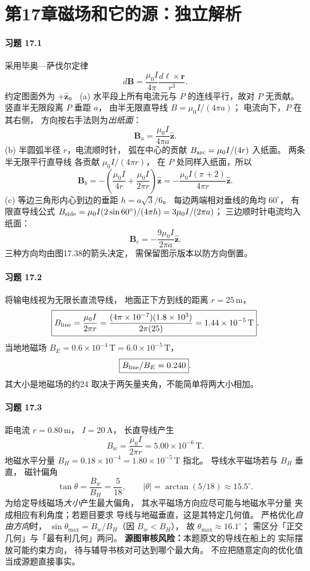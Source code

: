 \section*{第17章\quad 磁场和它的源：独立解析}

\paragraph{习题 17.1}
采用毕奥—萨伐尔定律
\[
 d\boldsymbol B=\frac{\mu_0 I}{4\pi}
 \frac{d\boldsymbol\ell\times\boldsymbol r}{r^3}.
\]
约定图面外为 \(+\hat{\boldsymbol z}\)。
(a) 水平段上所有电流元与
\(P\) 的连线平行，故对 \(P\) 无贡献。
竖直半无限段离 \(P\) 垂距 \(a\)，
由半无限直导线
\(B=\mu_0I/(4\pi a)\)；
电流向下，\(P\) 在其右侧，
方向按右手法则为\emph{出纸面}：
\[
 \boxed{\boldsymbol B_a=
 \frac{\mu_0I}{4\pi a}\hat{\boldsymbol z}}.
\]
(b) 半圆弧半径 \(r\)，电流顺时针，
弧在中心的贡献
\(B_{\rm arc}=\mu_0I/(4r)\) 入纸面。
两条半无限平行直导线
各贡献 \(\mu_0I/(4\pi r)\)，
在 \(P\) 处同样入纸面，所以
\[
 \boxed{\boldsymbol B_b=
 -\left(\frac{\mu_0I}{4r}
 +\frac{\mu_0I}{2\pi r}\right)
 \hat{\boldsymbol z}
 =-\frac{\mu_0I(\pi+2)}{4\pi r}
 \hat{\boldsymbol z}}.
\]
(c) 等边三角形内心到边的垂距
\(h=a\sqrt3/6\)。
每边两端相对垂线的角均 \(60^\circ\)，
有限直导线公式
\(B_{\rm side}=\mu_0I(2\sin60^\circ)/(4\pi h)
 =3\mu_0I/(2\pi a)\)；
三边顺时针电流均入纸面：
\[
 \boxed{\boldsymbol B_c=
 -\frac{9\mu_0I}{2\pi a}\hat{\boldsymbol z}}.
\]
三种方向均由图17.38的箭头决定，
需保留图示版本以防方向倒置。

\paragraph{习题 17.2}
将输电线视为无限长直流导线，
地面正下方到线的距离 \(r=25\,\mathrm m\)，
\[
 \boxed{B_{\rm line}=\frac{\mu_0I}{2\pi r}
 =\frac{(4\pi\times10^{-7})(1.8\times10^3)}
 {2\pi(25)}
 =1.44\times10^{-5}\,\mathrm T}.
\]
当地地磁场
\(B_E=0.6\times10^{-4}\,\mathrm T
 =6.0\times10^{-5}\,\mathrm T\)，
\[
 \boxed{B_{\rm line}/B_E=0.240}.
\]
其大小是地磁场的约24%
取决于两矢量夹角，不能简单将两大小相加。

\paragraph{习题 17.3}
距电流 \(r=0.80\,\mathrm m\)，
\(I=20\,\mathrm A\)，
长直导线产生
\[
 \boxed{B_w=\frac{\mu_0I}{2\pi r}
 =5.00\times10^{-6}\,\mathrm T}.
\]
地磁水平分量
\(B_H=0.18\times10^{-4}
 =1.80\times10^{-5}\,\mathrm T\) 指北。
导线水平磁场若与 \(B_H\) 垂直，
磁针偏角
\[
 \boxed{\tan\theta=\frac{B_w}{B_H}
 =\frac5{18}},\qquad
 \boxed{|\theta|=\arctan(5/18)\approx15.5^\circ}.
\]
为给定导线磁场\emph{大小}产生最大偏角，
其水平磁场方向应尽可能与地磁水平分量
夹成相应有利角度；若题目要求
导线与地磁垂直，这是其特定几何值。
严格优化\emph{自由方向}时，
\(\sin\theta_{\max}=B_w/B_H\)（因 \(B_w<B_H\)），
故
\(\theta_{\max}\approx16.1^\circ\)；
需区分「正交几何」与「最有利几何」两问。
\textbf{源图审核风险：}本题原文的导线在船上的
实际摆放可能约束方向，
待与辅导书核对可达到哪个最大角。
不应把随意定向的优化值当成源题直接事实。

